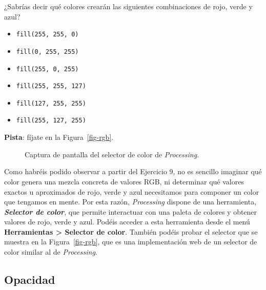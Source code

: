 \documentclass[
  spanish,
  11pt,
  a4paper,
  DIV=11,
  numbers=noendperiod]{scrartcl}
\providecommand{\tightlist}{%
  \setlength{\itemsep}{0pt}\setlength{\parskip}{0pt}}
\begin{document}
\begin{tcolorbox}[enhanced jigsaw, toprule=.15mm, coltitle=black, titlerule=0mm, opacitybacktitle=0.6, breakable, colback=white, colframe=quarto-callout-note-color-frame, colbacktitle=quarto-callout-note-color!10!white, opacityback=0, title={Ejercicio 9 - Colores RGB}, bottomtitle=1mm, rightrule=.15mm, toptitle=1mm, left=2mm, bottomrule=.15mm, leftrule=.75mm, arc=.35mm]

¿Sabrías decir qué colores crearán las siguientes combinaciones de rojo, verde y azul?

\begin{itemize}
\tightlist
\item
  \texttt{fill(255,\ 255,\ 0)}
\item
  \texttt{fill(0,\ 255,\ 255)}
\item
  \texttt{fill(255,\ 0,\ 255)}
\item
  \texttt{fill(255,\ 255,\ 127)}
\item
  \texttt{fill(127,\ 255,\ 255)}
\item
  \texttt{fill(255,\ 127,\ 255)}
\end{itemize}

\textbf{Pista}: fíjate en la Figura~\ref{fig-rgb}.

\end{tcolorbox}

\begin{figure}

\caption{\label{fig-colorpicker}Captura de pantalla del selector de color de \emph{Processing}.}

\end{figure}%

Como habréis podido observar a partir del Ejercicio 9, no es sencillo imaginar qué color genera una mezcla concreta de valores RGB, ni determinar qué valores exactos u aproximados de rojo, verde y azul necesitamos para componer un color que tengamos en mente. Por esta razón, \emph{Processing} dispone de una herramienta, \textbf{\emph{Selector de color}}, que permite interactuar con una paleta de colores y obtener valores de rojo, verde y azul. Podéis acceder a esta herramienta desde el menú \textbf{Herramientas \textgreater{} Selector de color}. También podéis probar el selector que se muestra en la Figura~\ref{fig-rgb}, que es una implementación web de un selector de color similar al de \emph{Processing}.

\subsection{Opacidad}
\end{document}
